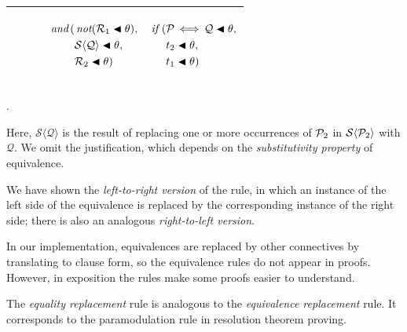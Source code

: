 \documentclass[runningheads]{llncs}
\DeclareMathOperator{\uand}{\emph{and}\,}
\DeclareMathOperator{\unot}{\emph{not}\kern-.0pt}
\DeclareMathOperator{\uiff}{\iff}
\DeclareMathOperator{\uif}{\emph{if}\,}
\begin{document}
\begin{center} 
\begin{tabular}{T}
\hline
$\qquad$  & 
  \begin{center}

$\begin{aligned}
\uand(&\unot({\expsub{\mathcal{R}}{1} \apply \theta}),\\
&\mathcal{S}\langle\mathcal{Q}\rangle\apply \theta, \\ 
&\expsub{\mathcal{R}}{2} \apply \theta)
\end{aligned}$
\end{center}
& 
\begin{center} $\begin{aligned}\uif\,(&{\mathcal{P} \uiff \mathcal{Q}\apply \theta}, \\
&{\expsub{t}{2} \apply \theta}, \\
&{\expsub{t}{1} \apply \theta})\end{aligned}$\end{center}
\\
\hline
\end{tabular}.
\end{center}


\noindent Here, $\mathcal{S}\langle\mathcal{Q}\rangle$ is the result of replacing one or more occurrences of ${\mathcal{P}}_{2}$ in $\mathcal{S}\langle{\mathcal{P}}_{2}\rangle$ with $\mathcal{Q}$. We omit the justification, which depends on the \emph{substitutivity property} of equivalence.

We have shown the \emph{left-to-right version} of the rule, in which an instance of the left side of the equivalence is replaced by the corresponding instance of the right side;  there is also an analogous \emph{right-to-left version}.

In our {\SNARK} implementation, equivalences are replaced by other connectives by  translating to clause form, so the equivalence rules do not appear in proofs.  However, in exposition the rules make some proofs easier to understand. 

The \emph{equality replacement} rule is analogous to the \emph{equivalence replacement} rule. It corresponds to the paramodulation rule in resolution theorem proving.
\end{document}

